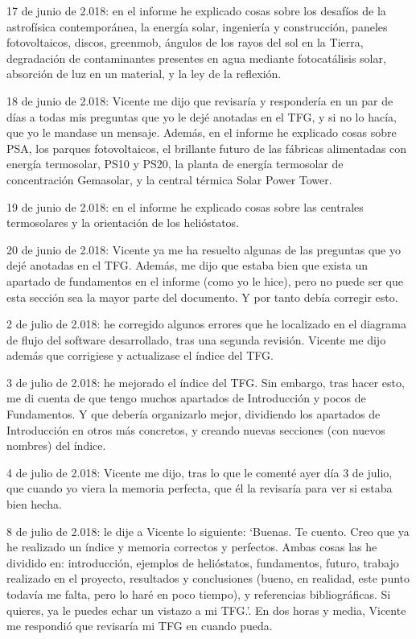 17 de junio de 2.018: en el informe he explicado cosas sobre los desafíos de la astrofísica contemporánea, la energía solar, ingeniería y construcción, paneles fotovoltaicos, discos, greenmob, ángulos de los rayos del sol en la Tierra, degradación de contaminantes presentes en agua mediante fotocatálisis solar, absorción de luz en un material, y la ley de la reflexión.

18 de junio de 2.018: Vicente me dijo que revisaría y respondería en un par de días a todas mis preguntas que yo le dejé anotadas en el TFG, y si no lo hacía, que yo le mandase un mensaje. Además, en el informe he explicado cosas sobre PSA, los parques fotovoltaicos, el brillante futuro de las fábricas alimentadas con energía termosolar, PS10 y PS20, la planta de energía termosolar de concentración Gemasolar, y la central térmica Solar Power Tower.

19 de junio de 2.018: en el informe he explicado cosas sobre las centrales termosolares y la orientación de los helióstatos.

20 de junio de 2.018: Vicente ya me ha resuelto algunas de las preguntas que yo dejé anotadas en el TFG. Además, me dijo que estaba bien que exista un apartado de fundamentos en el informe (como yo le hice), pero no puede ser que esta sección sea la mayor parte del documento. Y por tanto debía corregir esto.

2 de julio de 2.018: he corregido algunos errores que he localizado en el diagrama de flujo del software desarrollado, tras una segunda revisión. Vicente me dijo además que corrigiese y actualizase el índice del TFG.

3 de julio de 2.018: he mejorado el índice del TFG. Sin embargo, tras hacer esto, me di cuenta de que tengo muchos apartados de Introducción y pocos de Fundamentos. Y que debería organizarlo mejor, dividiendo los apartados de Introducción en otros más concretos, y creando nuevas secciones (con nuevos nombres) del índice.

4 de julio de 2.018: Vicente me dijo, tras lo que le comenté ayer día 3 de julio, que cuando yo viera la memoria perfecta, que él la revisaría para ver si estaba bien hecha.

8 de julio de 2.018: le dije a Vicente lo siguiente: ‘Buenas. Te cuento. Creo que ya he realizado un índice y memoria correctos y perfectos. Ambas cosas las he dividido en: introducción, ejemplos de helióstatos, fundamentos, futuro, trabajo realizado en el proyecto, resultados y conclusiones (bueno, en realidad, este punto todavía me falta, pero lo haré en poco tiempo), y referencias bibliográficas. Si quieres, ya le puedes echar un vistazo a mi TFG.’. En dos horas y media, Vicente me respondió que revisaría mi TFG en cuando pueda.

